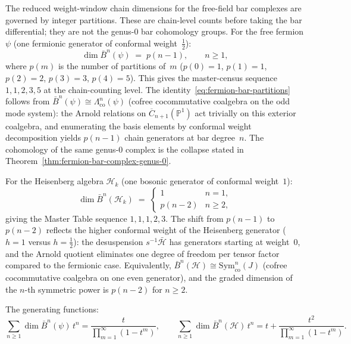\begin{lemma}%
\label{lem:bar-dims-partitions}
The reduced weight-window chain dimensions for the free-field bar
complexes are governed by integer partitions. These are chain-level
counts before taking the bar differential; they are not the
genus-$0$ bar cohomology groups. For the free fermion $\psi$ (one
fermionic generator of conformal weight~$\frac{1}{2}$):
\begin{equation}\label{eq:fermion-bar-partitions}
\dim \bar{B}^n(\psi) \;=\; p(n-1), \qquad n \geq 1,
\end{equation}
where $p(m)$ is the number of partitions of~$m$
($p(0) = 1$, $p(1) = 1$, $p(2) = 2$, $p(3) = 3$, $p(4) = 5$).
This gives the master-census sequence $1, 1, 2, 3, 5$ at the
chain-counting level.
The identity~\eqref{eq:fermion-bar-partitions} follows from
$\bar{B}^n(\psi) \cong \Lambda^n_{\mathrm{co}}(\psi)$
(cofree cocommutative coalgebra on the odd mode system):
the Arnold relations on $\overline{C}_{n+1}(\mathbb{P}^1)$ act
trivially on this exterior coalgebra, and enumerating the basis
elements by conformal weight decomposition yields $p(n-1)$
chain generators at bar degree~$n$. The cohomology of the same
genus-$0$ complex is the collapse stated in
Theorem~\ref{thm:fermion-bar-complex-genus-0}.

For the Heisenberg algebra $\mathcal{H}_k$ (one bosonic generator
of conformal weight~$1$):
\begin{equation}\label{eq:heisenberg-bar-partitions}
\dim \bar{B}^n(\mathcal{H}_k) \;=\;
\begin{cases}
1 & n = 1, \\
p(n-2) & n \geq 2,
\end{cases}
\end{equation}
giving the Master Table sequence $1, 1, 1, 2, 3$.
The shift from $p(n-1)$ to $p(n-2)$ reflects the higher
conformal weight of the Heisenberg generator ($h = 1$ versus
$h = \frac{1}{2}$): the desuspension $s^{-1}\bar{\mathcal{H}}$
has generators starting at weight~$0$, and the Arnold quotient
eliminates one degree of freedom per tensor factor compared to
the fermionic case. Equivalently,
$\bar{B}^n(\mathcal{H}) \cong \mathrm{Sym}^n_{\mathrm{co}}(J)$
(cofree cocommutative coalgebra on one even generator), and the
graded dimension of the $n$-th symmetric power is $p(n-2)$
for $n \geq 2$.

The generating functions:
\[
\sum_{n \geq 1} \dim \bar{B}^n(\psi)\, t^n
= \frac{t}{\prod_{m=1}^\infty (1-t^m)},
\qquad
\sum_{n \geq 1} \dim \bar{B}^n(\mathcal{H})\, t^n
= t + \frac{t^2}{\prod_{m=1}^\infty (1-t^m)}.
\]
\end{lemma}


